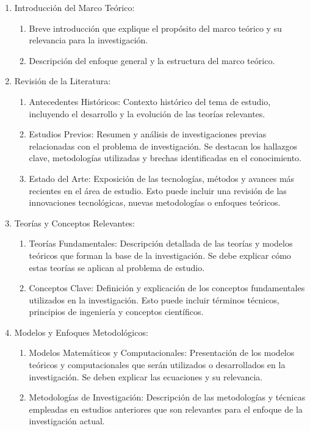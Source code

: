 \begin{enumerate}
    \item Introducción del Marco Teórico:
    \begin{enumerate}
        \item Breve introducción que explique el propósito del marco teórico y su relevancia para la investigación.
        \item Descripción del enfoque general y la estructura del marco teórico.
    \end{enumerate}
    \item Revisión de la Literatura:
    \begin{enumerate}
        \item Antecedentes Históricos: Contexto histórico del tema de estudio, incluyendo el desarrollo y la evolución de las teorías relevantes.
        \item Estudios Previos: Resumen y análisis de investigaciones previas relacionadas con el problema de investigación. Se destacan los hallazgos clave, metodologías utilizadas y brechas identificadas en el conocimiento.
        \item Estado del Arte: Exposición de las tecnologías, métodos y avances más recientes en el área de estudio. Esto puede incluir una revisión de las innovaciones tecnológicas, nuevas metodologías o enfoques teóricos.
    \end{enumerate}
    \item Teorías y Conceptos Relevantes:
    \begin{enumerate}
        \item Teorías Fundamentales: Descripción detallada de las teorías y modelos teóricos que forman la base de la investigación. Se debe explicar cómo estas teorías se aplican al problema de estudio.
        \item Conceptos Clave: Definición y explicación de los conceptos fundamentales utilizados en la investigación. Esto puede incluir términos técnicos, principios de ingeniería y conceptos científicos.
    \end{enumerate}
    \item Modelos y Enfoques Metodológicos:
    \begin{enumerate}
        \item Modelos Matemáticos y Computacionales: Presentación de los modelos teóricos y computacionales que serán utilizados o desarrollados en la investigación. Se deben explicar las ecuaciones y su relevancia.
        \item Metodologías de Investigación: Descripción de las metodologías y técnicas empleadas en estudios anteriores que son relevantes para el enfoque de la investigación actual.

\end{enumerate}
\end{enumerate}
